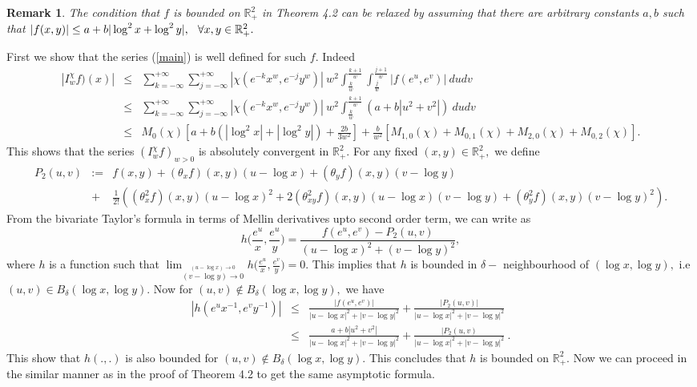 \documentclass[12pt]{article}
\newtheorem{rmk}{Remark}[section]
\begin{document}
{\begin{rmk}
The condition that $f$ is bounded on $ \mathbb{R}^{2}_{+}$ in Theorem 4.2 can be relaxed by assuming that there are arbitrary constants $a,b$ such that
$ |f(x,y)| \leq a + b|\log^{2}x + \log^{2}y | , \hspace{0.25cm} \forall x,y \in \mathbb{R}^{2}_{+}.$
\end{rmk} First we show that the series (\ref{main}) is well defined for such $f.$ Indeed
\begin{eqnarray*}
|I_{w}^{\chi}f)(x)| &\leq &  \sum_{k= - \infty}^{+\infty}\sum_{j= - \infty}^{+\infty}  |\chi(e^{-k} x^{w},e^{-j} y^{w})| \  w^{2} \int_{\frac{k}{w}}^{\frac{k+1}{w}} \int_{\frac{j}{w}}^{\frac{j+1}{w}}|f(e^{u},e^{v})| \ dudv \\
& \leq & \sum_{k= - \infty}^{+\infty} \sum_{j= - \infty}^{+\infty}|\chi(e^{-k} x^{w},e^{-j} y^{w})| \  w^{2} \int_{\frac{k}{w}}^{\frac{k+1}{w}} (a + b| u^{2}+v^{2}|) \ dudv \\
& \leq & M_{0}(\chi) \left[ a+b \left(|\log^{2} x| + |\log^{2}y| \right)+ \frac{2b}{3w^{2}} \right]+ \frac{b}{w^{2}} \left[ M_{1,0}(\chi)+M_{0,1}(\chi)+M_{2,0}(\chi)+M_{0,2}(\chi) \right ].
\end{eqnarray*}
This shows that the series $(I_{w}^{\chi}f)_{w>0}$ is absolutely convergent in $\mathbb{R}^{2}_{+}.$ For any fixed $(x,y) \in \mathbb{R}^{2}_{+},$ we define
\begin{eqnarray*}
P_{2}(u,v)&:=& f(x,y)+ (\theta_{x} f)(x,y) (u-\log x)+(\theta_{y} f)(x,y) (v-\log y)\\
& +& \frac{1}{2!}\left((\theta^{2}_{x} f)(x,y)(u-\log x)^{2}+2(\theta^{2}_{xy} f)(x,y)(u-\log x)(v-\log y)+(\theta^{2}_{y} f)(x,y)(v-\log y)^{2}\right).
\end{eqnarray*}
From the bivariate Taylor's formula in terms of Mellin derivatives upto second order term, we can write as
$$ h \bigg(\frac{e^{u}}{x},\frac{e^{u}}{y}\bigg) = \frac{f(e^{u},e^{v}) - P_{2}(u,v)}{(u-\log x)^{2}+(v-\log y)^{2}},$$
where $h$ is a function such that $\displaystyle \lim_{\stackrel{(u- \log x) \rightarrow 0}{(v- \log y) \rightarrow 0}} h \bigg(\frac{e^{u}}{x},\frac{e^{v}}{y}\bigg)=0.$ This implies that $h$ is bounded in $\delta-$ neighbourhood of $(\log x, \log y),$ i.e $(u,v) \in B_{\delta}(\log x, \log y).$ Now for $(u,v) \notin B_{\delta}(\log x, \log y),$ we have
\begin{eqnarray*}
|h(e^{u} x^{-1},e^{v} y^{-1})| & \leq & \frac{|f(e^{u},e^{v})|}{|u - \log x|^{2}+|v - \log y|^{2}} + \frac{|P_{2}(u,v)|}{|u - \log x|^{2}+|v - \log y|^{2}} \\
& \leq & \frac{a+ b |u^{2}+v^{2}|}{|u - \log x|^{2}+|v - \log y|^{2}} + \frac{|P_{2}(u,v)}{|u - \log x|^{2}+|v - \log y|^{2}} \ .
\end{eqnarray*}
This show that  $h(.,.)$ is also bounded for $(u,v) \notin B_{\delta}(\log x, \log y).$ This concludes that $ h$ is bounded on $\mathbb{R}^{2}_{+}.$ Now we can proceed in the similar manner as in the proof of Theorem 4.2 to get the same asymptotic formula.\\

}
\end{document}
